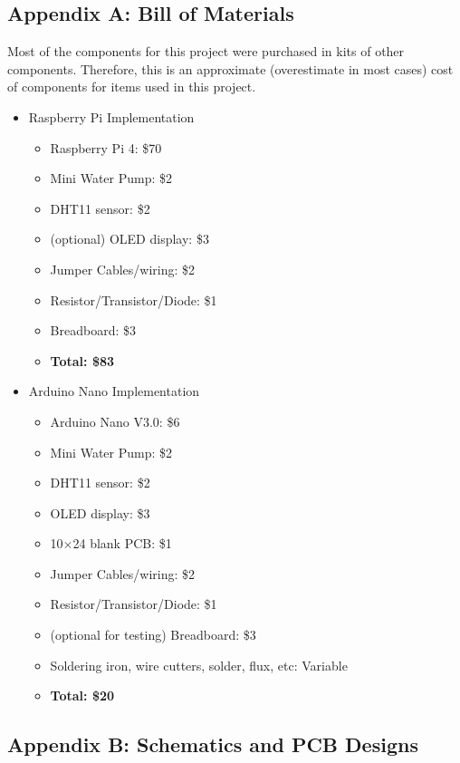 \documentclass{article}
\begin{document}
	\subsection{Appendix A: Bill of Materials}
	Most of the components for this project were purchased in kits of other components. Therefore, this is an approximate (overestimate in most cases) cost of components for items used in this project. 
	
	\begin{multicols}{2}
		\begin{itemize}
			\item Raspberry Pi Implementation
			\begin{itemize}
				\item Raspberry Pi 4: \$70
				\item Mini Water Pump: \$2
				\item DHT11 sensor: \$2
				\item (optional) OLED display: \$3
				\item Jumper Cables/wiring: \$2
				\item Resistor/Transistor/Diode: \$1
				\item Breadboard: \$3
				\item \textbf{Total: \$83}
			\end{itemize}
			
			\columnbreak
			
			\item Arduino Nano Implementation
			\begin{itemize}
				\item Arduino Nano V3.0: \$6
				\item Mini Water Pump: \$2
				\item DHT11 sensor: \$2
				\item OLED display: \$3
				\item 10$\times$24 blank PCB: \$1
				\item Jumper Cables/wiring: \$2
				\item Resistor/Transistor/Diode: \$1
				\item (optional for testing) Breadboard: \$3
				\item Soldering iron, wire cutters, solder, flux, etc: Variable
				\item \textbf{Total: \$20}
			\end{itemize}
		\end{itemize}
	\end{multicols}
	
	\subsection{Appendix B: Schematics and PCB Designs \label{appendix:schematics}}
	
\end{document}
